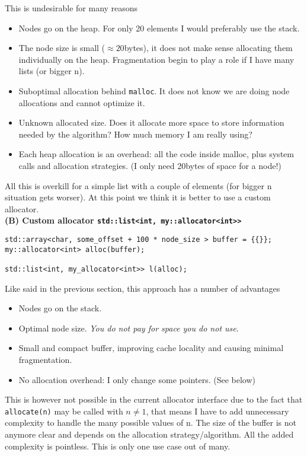\documentclass[11pt]{article}
\begin{document}
\medskip
This is undesirable for many reasons
\begin{itemize}
\item Nodes go on the heap. For only 20 elements I would preferably
use the stack.
\item The node size is small ($\approx 20$bytes), it does not make sense allocating
them individually on the heap. Fragmentation begin to play a role
if I have many lists (or bigger n).
\item Suboptimal allocation behind \texttt{malloc}. It does not
know we are doing node allocations and cannot optimize it.
\item Unknown allocated size. Does it allocate more space to store information
needed by the algorithm? How much memory I am really using?
\item  Each heap allocation is an overhead: all the code inside malloc, plus
system calls and allocation strategies. (I only need 20bytes of space for a
node!)
\end{itemize}

All this is overkill for a simple list with a couple of elements
(for bigger n situation gets worser). At this point we think it is
better to use a custom allocator. \\

\medskip
\medskip
\noindent
{\bf (B) Custom allocator \texttt{std::list<int, my::allocator<int>>}} \\

\medskip
\begin{lstlisting}
std::array<char, some_offset + 100 * node_size > buffer = {{}};
my::allocator<int> alloc(buffer);

std::list<int, my_allocator<int>> l(alloc);
\end{lstlisting}

Like said in the previous section, this approach has a number of advantages
\begin{itemize}
\item Nodes go on the stack.
\item Optimal node size. {\it You do not pay for space you do not use}.
\item Small and compact buffer, improving cache locality and causing
minimal fragmentation.
\item No allocation overhead: I only change some pointers. (See below)
\end{itemize}

This is however not possible in the current allocator interface
due to the fact that \texttt{allocate(n)} may be called with $n \ne 1$,
that means I have to add unnecessary complexity to handle the many possible
values of n. The size of the buffer is not anymore clear and depends on the
allocation strategy/algorithm. All the added complexity is pointless. This is
only one use case out of many.
\end{document}
